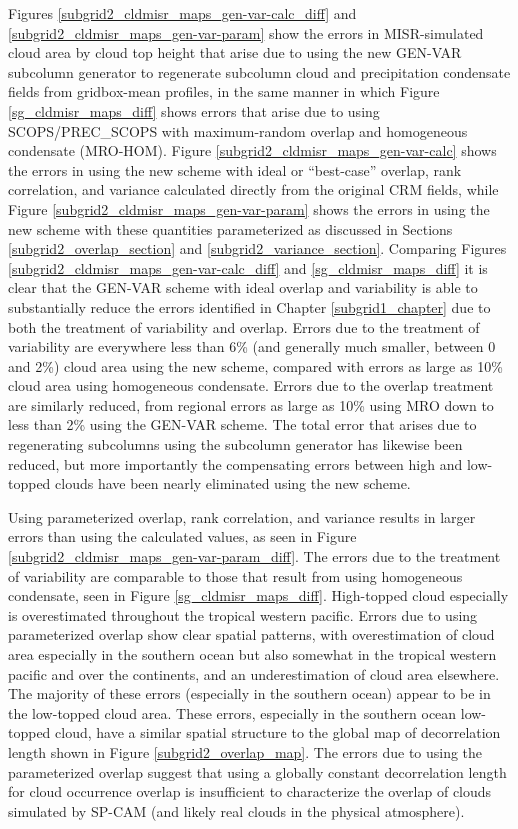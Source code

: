 Figures \ref{subgrid2_cldmisr_maps_gen-var-calc_diff} and \ref{subgrid2_cldmisr_maps_gen-var-param} show the errors in MISR-simulated cloud area by cloud top height that arise due to using the new GEN-VAR subcolumn generator to regenerate subcolumn cloud and precipitation condensate fields from gridbox-mean profiles, in the same manner in which Figure \ref{sg_cldmisr_maps_diff} shows errors that arise due to using SCOPS/PREC\_SCOPS with maximum-random overlap and homogeneous condensate (MRO-HOM). Figure \ref{subgrid2_cldmisr_maps_gen-var-calc} shows the errors in using the new scheme with ideal or ``best-case'' overlap, rank correlation, and variance calculated directly from the original CRM fields, while Figure \ref{subgrid2_cldmisr_maps_gen-var-param} shows the errors in using the new scheme with these quantities parameterized as discussed in Sections \ref{subgrid2_overlap_section} and \ref{subgrid2_variance_section}. Comparing Figures \ref{subgrid2_cldmisr_maps_gen-var-calc_diff} and \ref{sg_cldmisr_maps_diff} it is clear that the GEN-VAR scheme with ideal overlap and variability is able to substantially reduce the errors identified in Chapter \ref{subgrid1_chapter} due to both the treatment of variability and overlap. Errors due to the treatment of variability are everywhere less than 6\% (and generally much smaller, between 0 and 2\%) cloud area using the new scheme, compared with errors as large as 10\% cloud area using homogeneous condensate. Errors due to the overlap treatment are similarly reduced, from regional errors as large as 10\% using MRO down to less than 2\% using the GEN-VAR scheme. The total error that arises due to regenerating subcolumns using the subcolumn generator has likewise been reduced, but more importantly the compensating errors between high and low-topped clouds have been nearly eliminated using the new scheme.

Using parameterized overlap, rank correlation, and variance results in larger errors than using the calculated values, as seen in Figure \ref{subgrid2_cldmisr_maps_gen-var-param_diff}. The errors due to the treatment of variability are comparable to those that result from using homogeneous condensate, seen in Figure \ref{sg_cldmisr_maps_diff}. High-topped cloud especially is overestimated throughout the tropical western pacific. Errors due to using parameterized overlap show clear spatial patterns, with overestimation of cloud area especially in the southern ocean but also somewhat in the tropical western pacific and over the continents, and an underestimation of cloud area elsewhere. The majority of these errors (especially in the southern ocean) appear to be in the low-topped cloud area. These errors, especially in the southern ocean low-topped cloud, have a similar spatial structure to the global map of decorrelation length shown in Figure \ref{subgrid2_overlap_map}. The errors due to using the parameterized overlap suggest that using a globally constant decorrelation length for cloud occurrence overlap is insufficient to characterize the overlap of clouds simulated by SP-CAM (and likely real clouds in the physical atmosphere). 

